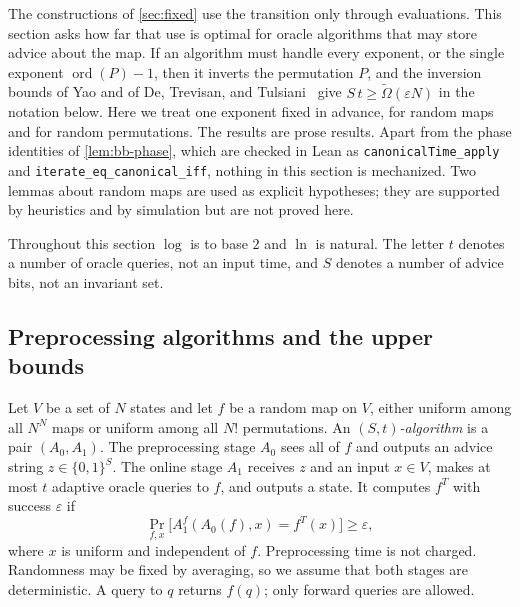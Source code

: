\documentclass[11pt]{article}
\theoremstyle{definition}
\theoremstyle{remark}
\newcommand{\bits}{\{0,1\}}
\newcommand{\ord}{\operatorname{ord}}
\numberwithin{equation}{section}
\begin{document}
The constructions of \cref{sec:fixed} use the transition only through
evaluations.  This section asks how far that use is optimal for oracle
algorithms that may store advice about the map.  If an algorithm must
handle every exponent, or the single exponent $\ord(P)-1$, then it inverts
the permutation $P$, and the inversion bounds of Yao and of De, Trevisan,
and Tulsiani~\cite{Yao90,DTT10} give $S\,t\geq\widetilde\Omega(\varepsilon N)$
in the notation below.  Here we treat one exponent fixed in advance, for
random maps and for random permutations.  The results are prose results.
Apart from the phase identities of \cref{lem:bb-phase}, which are checked
in Lean as \texttt{canonicalTime\_apply} and
\texttt{iterate\_eq\_canonical\_iff}, nothing in this section is mechanized.  Two lemmas about random
maps are used as explicit hypotheses; they are supported by heuristics and
by simulation but are not proved here.

Throughout this section $\log$ is to base $2$ and $\ln$ is natural.  The
letter $t$ denotes a number of oracle queries, not an input time, and $S$
denotes a number of advice bits, not an invariant set.

\subsection{Preprocessing algorithms and the upper bounds}

Let $V$ be a set of $N$ states and let $f$ be a random map on $V$, either
uniform among all $N^N$ maps or uniform among all $N!$ permutations.  An
\emph{$(S,t)$-algorithm} is a pair $(A_0,A_1)$.  The preprocessing stage
$A_0$ sees all of $f$ and outputs an advice string $z\in\bits^S$.  The
online stage $A_1$ receives $z$ and an input $x\in V$, makes at most $t$
adaptive oracle queries to $f$, and outputs a state.  It computes $f^T$
with success $\varepsilon$ if
\[
  \Pr_{f,x}\bigl[A_1^f(A_0(f),x)=f^T(x)\bigr]\geq\varepsilon,
\]
where $x$ is uniform and independent of $f$.  Preprocessing time is not
charged.  Randomness may be fixed by averaging, so we assume that both
stages are deterministic.  A query to $q$ returns $f(q)$; only forward
queries are allowed.
\end{document}
